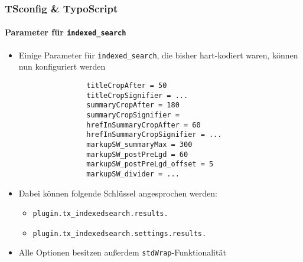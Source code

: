 \begin{frame}[fragile]
	\frametitle{TSconfig \& TypoScript}
	\framesubtitle{Parameter für \texttt{indexed\_search}}

	\lstset{basicstyle=\tiny\ttfamily}

	\begin{itemize}
		\item Einige Parameter für \texttt{indexed\_search}, die bisher hart-kodiert waren, können nun konfiguriert werden

			\begin{lstlisting}
				titleCropAfter = 50
				titleCropSignifier = ...
				summaryCropAfter = 180
				summaryCropSignifier =
				hrefInSummaryCropAfter = 60
				hrefInSummaryCropSignifier = ...
				markupSW_summaryMax = 300
				markupSW_postPreLgd = 60
				markupSW_postPreLgd_offset = 5
				markupSW_divider = ...
			\end{lstlisting}

		\item Dabei können folgende Schlüssel angesprochen werden:
			\begin{itemize}
				\item \texttt{plugin.tx\_indexedsearch.results.}
				\item \texttt{plugin.tx\_indexedsearch.settings.results.}
			\end{itemize}

		\item Alle Optionen besitzen außerdem \texttt{stdWrap}-Funktionalität

	\end{itemize}

\end{frame}

